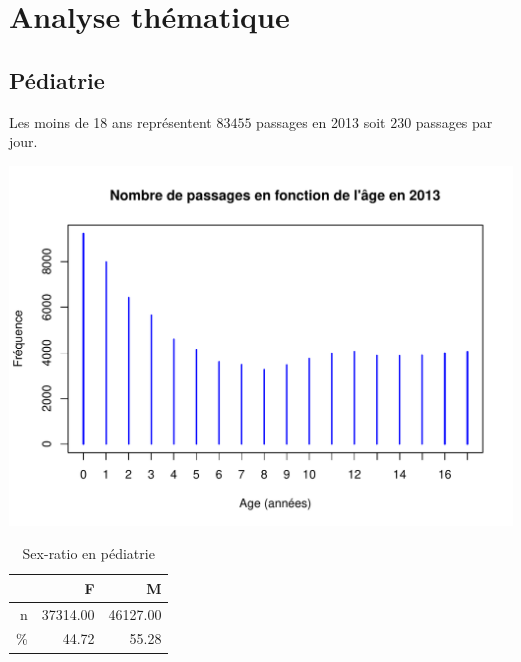 \documentclass[12pt,english,french,twoside]{book}\usepackage[]{graphicx}\usepackage[]{color}
\makeatletter
\def\maxwidth{ %
  \ifdim\Gin@nat@width>\linewidth
    \linewidth
  \else
    \Gin@nat@width
  \fi
}
\newenvironment{knitrout}{}{} %
\makeatother
\begin{document}

\part{Analyse thématique} 
\newpage

\chapter{Pédiatrie}

\label{chap_pediatrie}



Les moins de 18 ans représentent $83 455$ passages en 2013 soit $230$ passages par jour.


\begin{knitrout}
\color{fgcolor}
\includegraphics[width=\maxwidth]{figure/passages_pediatrie-1} 

\end{knitrout}


\begin{table}[ht]
\centering
\begin{tabular}{rrr}
  \hline
 & F & M \\ 
  \hline
n & 37314.00 & 46127.00 \\ 
  \% & 44.72 & 55.28 \\ 
   \hline
\end{tabular}
\caption[Sex-ratio en pédiatrie]{Sex-ratio en pédiatrie} 
\label{tab:ped_sr}
\end{table}
\end{document}

